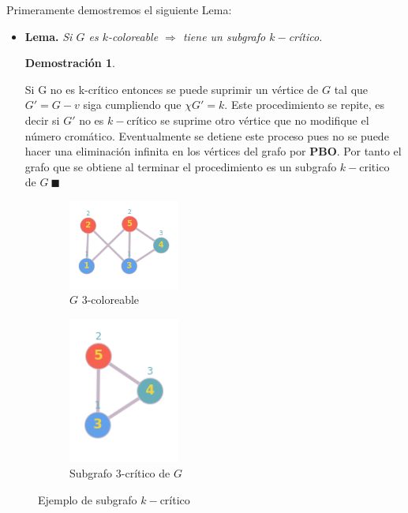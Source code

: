 \documentclass[a4paper,1pt]{report}
\newtheorem*{dem}{Demostración}
\begin{document}
Primeramente demostremos el siguiente Lema:
\begin{itemize}
    \item[]\textbf{Lema.}\textit{ Si $G$ es $k$-coloreable $\Rightarrow$ tiene un subgrafo $k-$cr\'itico.}

    \begin{dem}        
    \end{dem}
    Si G no es k-crítico entonces se puede suprimir un v\'ertice de $G$ tal que $G' = G-v$ siga cumpliendo que $\chi{G'} = k$. 
    Este procedimiento se repite, es decir si $G'$ no es $k-$cr\'itico se suprime otro v\'ertice que no modifique el n\'umero crom\'atico.
    Eventualmente se detiene este proceso pues no se puede hacer una eliminaci\'on infinita en los v\'ertices del grafo por \textbf{PBO}. Por tanto el grafo que se obtiene al terminar el procedimiento es un subgrafo $k-$critico de $G \ \blacksquare$
\end{itemize}

\begin{figure}[H]
    \centering
    \begin{subfigure}[b]{0.55\textwidth}
        \centering
        \includegraphics[width=0.4\textwidth]{figures6/otroGcol.png}
        \caption{$G$ 3-coloreable}
    \end{subfigure} 
    \begin{subfigure}[b]{0.35\textwidth}
        \centering
        \includegraphics[width=0.4\textwidth]{figures6/3criticoSubG.png}
        \caption{Subgrafo $3$-cr\'itico de $G$}
    \end{subfigure}
    \caption{Ejemplo de subgrafo $k-$cr\'itico}
\end{figure} 
    
\end{document}
